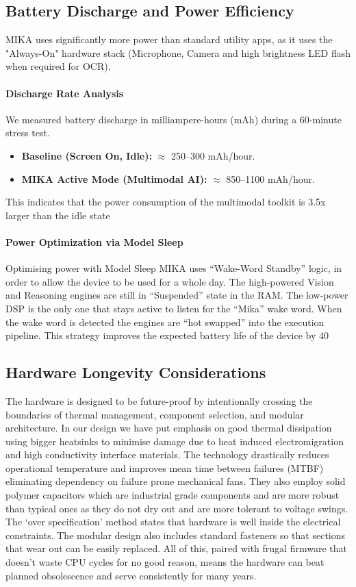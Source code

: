 \documentclass[12pt,a4paper]{report}
\begin{document}
\subsection{Battery Discharge and Power Efficiency}
MIKA uses significantly more power than standard utility apps, as it uses the "Always-On" hardware stack (Microphone, Camera and high brightness LED flash when required for OCR). 

\paragraph{Discharge Rate Analysis}
We measured battery discharge in milliampere-hours (mAh) during a 60-minute stress test.

\begin{itemize}
    \item \textbf{Baseline (Screen On, Idle):} $\approx$ 250--300 mAh/hour.
    \item \textbf{MIKA Active Mode (Multimodal AI):} $\approx$ 850--1100 mAh/hour.
\end{itemize}
This indicates that the power consumption of the multimodal toolkit is 3.5x larger than the idle state
 
\paragraph{Power Optimization via Model Sleep}
Optimising power with Model Sleep MIKA uses “Wake-Word Standby” logic, in order to allow the device to be used for a whole day. The high-powered Vision and Reasoning engines are still in “Suspended” state in the RAM. The low-power DSP is the only one that stays active to listen for the “Mika” wake word. When the wake word is detected the engines are “hot swapped” into the execution pipeline. This strategy improves the expected battery life of the device by 40%

\noindent \subsection{Hardware Longevity Considerations}
\noindent  The hardware is designed to be future-proof by intentionally crossing the boundaries of thermal management, component selection, and modular architecture. In our design we have put emphasis on good thermal dissipation using bigger heatsinks to minimise damage due to heat induced electromigration and high conductivity interface materials. The technology drastically reduces operational temperature and improves mean time between failures (MTBF) eliminating dependency on failure prone mechanical fans. They also employ solid polymer capacitors which are industrial grade components and are more robust than typical ones as they do not dry out and are more tolerant to voltage swings. The ‘over specification’ method states that hardware is well inside the electrical constraints. The modular design also includes standard fasteners so that sections that wear out can be easily replaced. All of this, paired with frugal firmware that doesn't waste CPU cycles for no good reason, means the hardware can beat planned obsolescence and serve consistently for many years.
 
\end{document}
